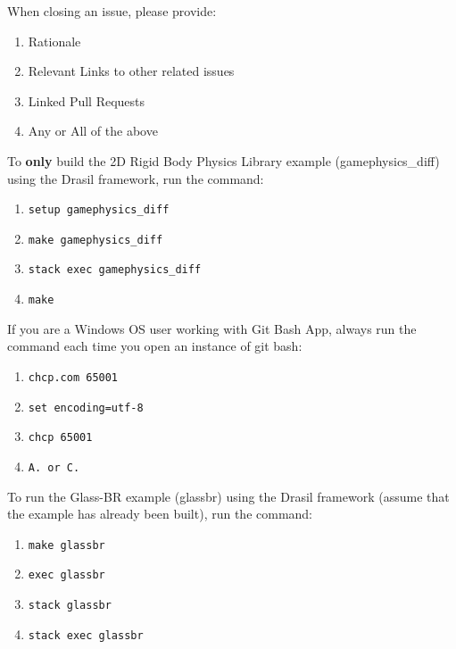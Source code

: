 \documentclass[12pt,fleqn]{examtst}
\begin{document}

\newpage
\noindent
\begin{minipage}{\textwidth}

When closing an issue, please provide:

\begin{enumerate}
    \item Rationale
    \item Relevant Links to other related issues
    \item Linked Pull Requests
    \item Any or All of the above
\end{enumerate}

To \textbf{only} build the 2D Rigid Body Physics Library example (gamephysics\_diff) using the Drasil framework, run the command:

\begin{enumerate}
    \item \lstinline{setup gamephysics_diff}
    \item \lstinline{make gamephysics_diff}
    \item \lstinline{stack exec gamephysics_diff}
    \item \lstinline{make}
\end{enumerate}

If you are a Windows OS user working with Git Bash App, always run the command each time you open an instance of git bash:

\begin{enumerate}
    \item \lstinline{chcp.com 65001} 
    \item \lstinline{set encoding=utf-8}
    \item \lstinline{chcp 65001}
    \item \lstinline{A. or C.}
\end{enumerate}

To run the Glass-BR example (glassbr) using the Drasil framework (assume that the example has already been built), run the command:

\begin{enumerate}
    \item \lstinline{make glassbr}
    \item \lstinline{exec glassbr}
    \item \lstinline{stack glassbr}
    \item \lstinline{stack exec glassbr}
\end{enumerate}

\end{minipage}
\end{document}
